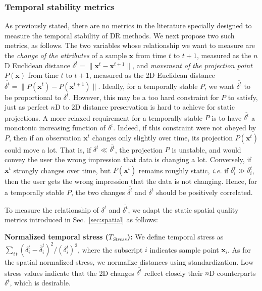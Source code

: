 \subsubsection{Temporal stability metrics}
%
As previously stated, there are no metrics in the literature specially designed to measure the temporal stability of DR methods. We next propose two such metrics, as follows. The two variables whose relationship we want to measure are the \emph{change of the attributes} of a sample $\mathbf{x}$ from time $t$ to $t+1$, measured as the $n$D Euclidean distance
$ \delta^t = \|\mathbf{x}^t - \mathbf{x}^{t+1}\|$, and \emph{movement of the projection point $P(\mathbf{x})$} from time $t$ to $t+1$, measured as the 2D Euclidean distance
$ \overline{\delta^t} = \|P(\mathbf{x}^t) - P(\mathbf{x}^{t+1})\|$. Ideally, for a temporally stable $P$, we want $\overline{\delta^t}$ to be proportional to $\delta^t$. However, this may be a too hard constraint for $P$ to satisfy, just as perfect $n$D to 2D distance preservation is hard to achieve for static projections. A more relaxed requirement for a temporally stable $P$ is to have
 $\overline{\delta^t}$ a monotonic increasing function of $\delta^t$. Indeed, if this constraint were not obeyed by $P$, then if an observation $\mathbf{x}^t$ changes only slightly over time, its projection  $P(\mathbf{x}^t)$ could move a lot. That is, if  $\delta^t \ll \overline{\delta^t}$, the projection $P$ is unstable, and would convey the user the wrong impression that data is changing a lot. Conversely, if $\mathbf{x}^t$ strongly changes over time, but $P(\mathbf{x}^t)$ remains roughly static, \emph{i.e.} if $\delta_i^t \gg \overline{\delta_i^t}$, then the user gets the wrong impression that the data is not changing. Hence, for a temporally stable $P$, the two changes $\overline{\delta^t}$ and ${\delta^t}$ should be positively correlated.

To measure the relationship of ${\delta^t}$ and $\overline{\delta^t}$, we adapt the static spatial quality metrics introduced in Sec.~\ref{sec:spatial} as follows:

\noindent
\textbf{Normalized temporal stress ($T_{Stress}$):} We define temporal stress as $\sum_{i\, t}{(\delta_{i}^{t}-\overline{\delta}_{i}^{t})^{2}} / { (\delta_{i}^t)^{2}}$, where the subscript $i$ indicates sample point $\mathbf{x}_i$. As for the spatial normalized stress, we normalize distances using standardization. Low stress values indicate that the 2D changes $\overline{\delta^t}$ reflect closely their $n$D counterparts ${\delta^t}$, which is desirable.


